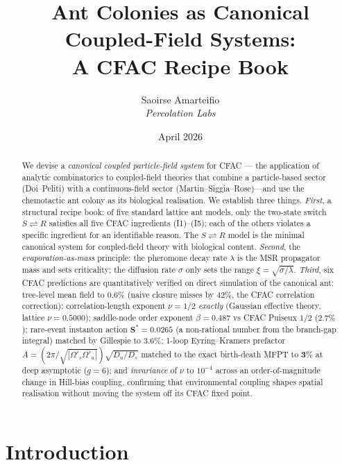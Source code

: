 \documentclass[10pt,a4paper,twocolumn]{article}
\title{Ant Colonies as Canonical Coupled-Field Systems:\\[4pt]
  \large A CFAC Recipe Book}
\author{Saoirse Amarteifio\\
  \small\textit{Percolation Labs}}
\date{April 2026}
\theoremstyle{definition}
\begin{document}
\maketitle

\begin{abstract}
We devise a \emph{canonical coupled particle-field system}
for CFAC \citep{Amarteifio2026cfac, Amarteifio2026cfactheorem}---
the application of analytic combinatorics to coupled-field
theories that combine a particle-based sector (Doi--Peliti) with
a continuous-field sector (Martin--Siggia--Rose)---and use the
chemotactic ant colony as its biological realisation.
We establish three things.  \emph{First}, a structural recipe
book: of five standard lattice ant models, only the two-state
switch $S\rightleftharpoons R$ satisfies all five CFAC
ingredients (I1)--(I5); each of the others violates a specific
ingredient for an identifiable reason.  The $S\rightleftharpoons
R$ model is the minimal canonical system for coupled-field
theory with biological content.  \emph{Second}, the
\emph{evaporation-as-mass} principle: the pheromone decay rate
$\lambda$ is the MSR propagator mass and sets criticality; the
diffusion rate $\sigma$ only sets the range
$\xi=\sqrt{\sigma/\lambda}$.  \emph{Third}, six CFAC predictions
are quantitatively verified on direct simulation of the
canonical ant: tree-level mean field to $\mathbf{0.6\%}$ (naive
closure misses by $42\%$, the CFAC correlation correction);
correlation-length exponent $\nu = 1/2$ \emph{exactly}
(Gaussian effective theory, lattice $\nu = 0.5000$);
saddle-node order exponent $\beta = 0.487$ vs CFAC Puiseux
$1/2$ ($2.7\%$); rare-event instanton action
$\boldsymbol{S^* = 0.0265}$ (a non-rational number from the
branch-gap integral) matched by Gillespie to $\mathbf{3.6\%}$;
1-loop Eyring--Kramers prefactor
$A = (2\pi/\sqrt{|\Omega'_s\Omega'_u|})\sqrt{D_u/D_s}$ matched to
the exact birth-death MFPT to $\mathbf{3\%}$ at deep asymptotic
($g=6$); and \emph{invariance} of $\nu$ to $10^{-4}$ across an
order-of-magnitude change in Hill-bias coupling, confirming that
environmental coupling shapes spatial realisation without moving
the system off its CFAC fixed point.
\end{abstract}

\tableofcontents

\section{Introduction}\label{sec:intro}
\end{document}
